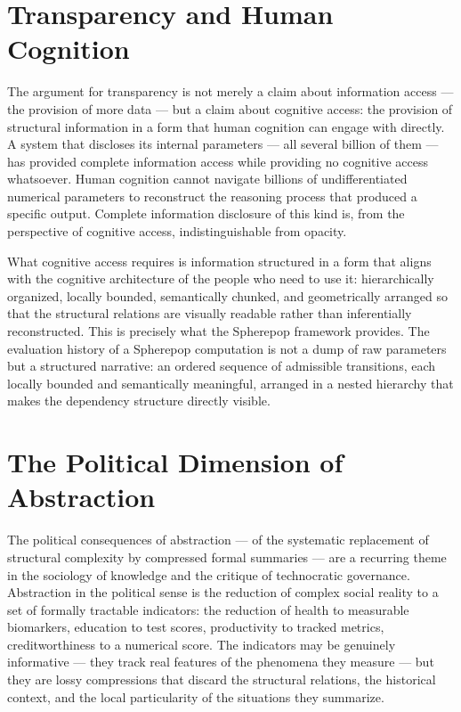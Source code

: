 \documentclass[12pt,openany]{book}
\theoremstyle{plain}
\theoremstyle{definition}
\theoremstyle{remark}
\begin{document}
\section{Transparency and Human Cognition}

The argument for transparency is not merely a claim about information access — the provision of more data — but a claim about cognitive access: the provision of structural information in a form that human cognition can engage with directly. A system that discloses its internal parameters — all several billion of them — has provided complete information access while providing no cognitive access whatsoever. Human cognition cannot navigate billions of undifferentiated numerical parameters to reconstruct the reasoning process that produced a specific output. Complete information disclosure of this kind is, from the perspective of cognitive access, indistinguishable from opacity.

What cognitive access requires is information structured in a form that aligns with the cognitive architecture of the people who need to use it: hierarchically organized, locally bounded, semantically chunked, and geometrically arranged so that the structural relations are visually readable rather than inferentially reconstructed. This is precisely what the Spherepop framework provides. The evaluation history of a Spherepop computation is not a dump of raw parameters but a structured narrative: an ordered sequence of admissible transitions, each locally bounded and semantically meaningful, arranged in a nested hierarchy that makes the dependency structure directly visible.

\section{The Political Dimension of Abstraction}

The political consequences of abstraction — of the systematic replacement of structural complexity by compressed formal summaries — are a recurring theme in the sociology of knowledge and the critique of technocratic governance. Abstraction in the political sense is the reduction of complex social reality to a set of formally tractable indicators: the reduction of health to measurable biomarkers, education to test scores, productivity to tracked metrics, creditworthiness to a numerical score. The indicators may be genuinely informative — they track real features of the phenomena they measure — but they are lossy compressions that discard the structural relations, the historical context, and the local particularity of the situations they summarize.
\end{document}
